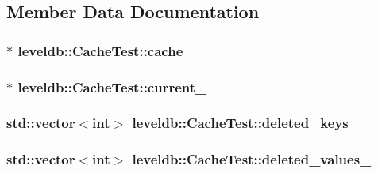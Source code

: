 \subsection{Member Data Documentation}
\hypertarget{classleveldb_1_1_cache_test_af2edcc8a47148050ba791f6a2b7a6165}{
\subsubsection[{cache\-\_\-}]{$\ast$ leveldb\-::\-Cache\-Test\-::cache\-\_\-}}\label{classleveldb_1_1_cache_test_af2edcc8a47148050ba791f6a2b7a6165}
\hypertarget{classleveldb_1_1_cache_test_a91ef57f644d0531b882caed9547759f6}{
\subsubsection[{current\-\_\-}]{ $\ast$ leveldb\-::\-Cache\-Test\-::current\-\_\-\hspace{0.3cm}{\ttfamily [static]}}}\label{classleveldb_1_1_cache_test_a91ef57f644d0531b882caed9547759f6}
\hypertarget{classleveldb_1_1_cache_test_aad6b825748f29b973a8934682eb50ed2}{
\subsubsection[{deleted\-\_\-keys\-\_\-}]{\setlength{\rightskip}{0pt plus 5cm}std\-::vector$<$int$>$ leveldb\-::\-Cache\-Test\-::deleted\-\_\-keys\-\_\-}}\label{classleveldb_1_1_cache_test_aad6b825748f29b973a8934682eb50ed2}
\hypertarget{classleveldb_1_1_cache_test_add979edecc72f9740b1d6d4951c13c02}{
\subsubsection[{deleted\-\_\-values\-\_\-}]{\setlength{\rightskip}{0pt plus 5cm}std\-::vector$<$int$>$ leveldb\-::\-Cache\-Test\-::deleted\-\_\-values\-\_\-}}\label{classleveldb_1_1_cache_test_add979edecc72f9740b1d6d4951c13c02}
